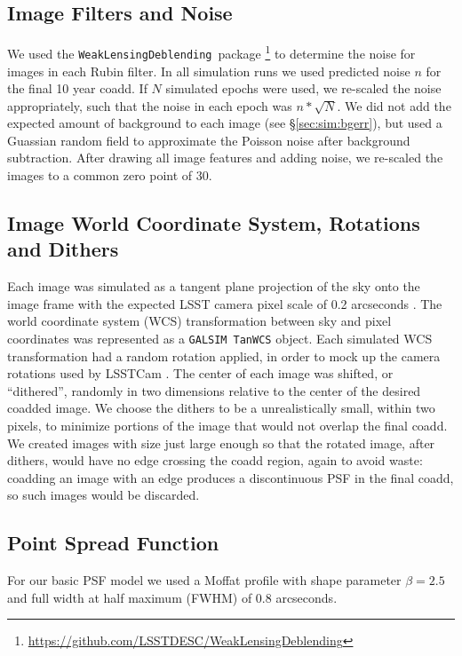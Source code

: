 \documentclass[twocolumn,twocolappendix,astrosym]{openjournal}
\newcommand{\descwl}{\texttt{WeakLensingDeblending}}
\newcommand{\galsim}{\texttt{GALSIM}}
\begin{document}
\subsection{Image Filters and Noise} \label{sec:sim:noise}

We used the \descwl\ package
\citep{DESCWLSanchez2021}\footnote{\url{https://github.com/LSSTDESC/WeakLensingDeblending}}
to determine the noise for images in each Rubin filter.  In all simulation runs we
used predicted noise $n$ for the final 10 year coadd.  If $N$ simulated epochs
were used, we re-scaled the noise appropriately, such that the noise in each
epoch was $n * \sqrt{N}$.  We did not add the expected amount of background to
each image (see \S \ref{sec:sim:bgerr}), but used a Guassian random field to
approximate the Poisson noise after background subtraction.  After drawing all
image features and adding noise, we re-scaled the images to a common zero point
of 30.

\subsection{Image World Coordinate System, Rotations and Dithers} \label{sec:sim:rotdith}

Each image was simulated as a tangent plane projection of the sky onto the
image frame with the expected LSST camera pixel scale of 0.2 arcseconds
\citep{IvezicLSST2008}.  The world coordinate system (WCS) transformation between
sky and pixel coordinates was represented as a \galsim\ \texttt{TanWCS} object.
Each simulated WCS transformation had a random rotation applied, in order to
mock up the camera rotations used by LSSTCam \citep{IvezicLSST2008}.  The
center of each image was shifted, or ``dithered'', randomly in two dimensions
relative to the center of the desired coadded image.  We choose the dithers to
be a unrealistically small, within two pixels, to minimize portions of the
image that would not overlap the final coadd.  We created images with size just
large enough so that the rotated image, after dithers, would have no edge
crossing the coadd region, again to avoid waste:  coadding an image with an
edge produces a discontinuous PSF in the final coadd, so such images would be
discarded.

\subsection{Point Spread Function} \label{sec:sim:psfs}

For our basic PSF model we used a Moffat profile \citep{Moffat1969} with shape
parameter $\beta=2.5$ and full width at half maximum (FWHM) of 0.8 arcseconds.
\end{document}
